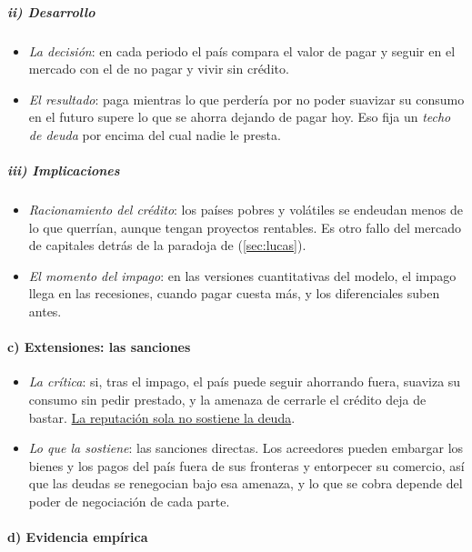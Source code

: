 \documentclass[11pt]{article}
\begin{document}
\subparagraph{ii) Desarrollo}

\begin{itemize}
\item \emph{La decisión}: en cada periodo el país compara el valor de pagar y seguir en el mercado con el de no pagar y vivir sin crédito.
\item \emph{El resultado}: paga mientras lo que perdería por no poder suavizar su consumo en el futuro supere lo que se ahorra dejando de pagar hoy. Eso fija un \emph{techo de deuda} por encima del cual nadie le presta.
\end{itemize}

\subparagraph{iii) Implicaciones}

\begin{itemize}
\item \emph{Racionamiento del crédito}: los países pobres y volátiles se endeudan menos de lo que querrían, aunque tengan proyectos rentables. Es otro fallo del mercado de capitales detrás de la paradoja de  (\ref{sec:lucas}).
\item \emph{El momento del impago}: en las versiones cuantitativas del modelo, el impago llega en las recesiones, cuando pagar cuesta más, y los diferenciales suben antes\nocite{Arellano2008}.
\end{itemize}

\paragraph{c) Extensiones: las sanciones}

\begin{itemize}
\item \emph{La crítica}: si, tras el impago, el país puede seguir ahorrando fuera, suaviza su consumo sin pedir prestado, y la amenaza de cerrarle el crédito deja de bastar. \uline{La reputación sola no sostiene la deuda}\nocite{BulowRogoff1989AER}.
\item \emph{Lo que la sostiene}: las sanciones directas. Los acreedores pueden embargar los bienes y los pagos del país fuera de sus fronteras y entorpecer su comercio, así que las deudas se renegocian bajo esa amenaza, y lo que se cobra depende del poder de negociación de cada parte\nocite{BulowRogoff1989JPE}.
\end{itemize}

\paragraph{d) Evidencia empírica}
\end{document}
